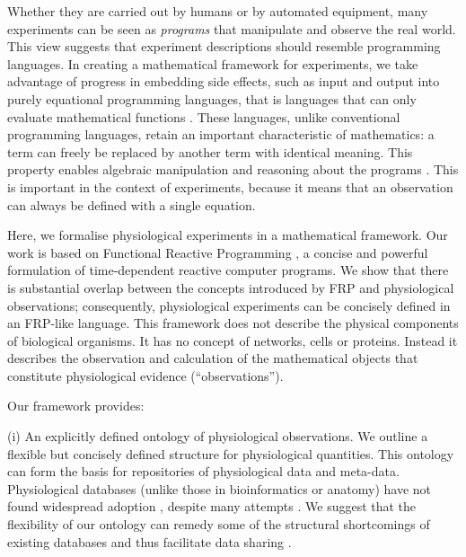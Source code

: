 Whether they are carried out by humans or by automated equipment, many
experiments can be seen as \emph{programs} that manipulate and observe
the real world. This view suggests that experiment descriptions should
resemble programming languages. In creating a mathematical framework
for experiments, we take advantage of progress in embedding side
effects, such as input and output \citep{PeytonJones2002, Roy2004,
  Wadler1995} into purely equational programming languages, that is
languages that can only evaluate mathematical functions
\citep{Church1941}. These languages, unlike conventional programming
languages, retain an important characteristic of mathematics: a term
can freely be replaced by another term with identical meaning.
This property \citep[referential transparency;][]{Whitehead1927} enables
algebraic manipulation and reasoning about the programs
\citep{Bird1996}. This is important in the context of experiments,
because it means that an observation can always be defined with a
single equation.

Here, we formalise physiological experiments in a mathematical
framework. Our work is based on Functional Reactive Programming
\citep[FRP;][]{Elliott1997, Nilsson2002}, a concise and powerful
formulation of time-dependent reactive computer programs. We show that
there is substantial overlap between the concepts introduced by FRP
and physiological observations; consequently, physiological
experiments can be concisely defined in an FRP-like language. This
framework does not describe the physical components of biological
organisms. It has no concept of networks, cells or proteins. Instead
it describes the observation and calculation of the mathematical
objects that constitute physiological evidence (``observations'').

Our framework provides:

(i) An explicitly defined ontology of physiological observations. We
outline a flexible but concisely defined structure for physiological
quantities. This ontology can form the basis for repositories of
physiological data and meta-data. Physiological databases (unlike
those in bioinformatics or anatomy) have not found widespread adoption
\citep{Herz2008, Amari2002}, despite many attempts \citep{Katz2010,
  Teeters2008, Gardner2004, Jessop2010}. We suggest that the
flexibility of our ontology can remedy some of the structural
shortcomings of existing databases \citep{Gardner2005, Amari2002} and
thus facilitate data sharing \citep{Insel2003}.


